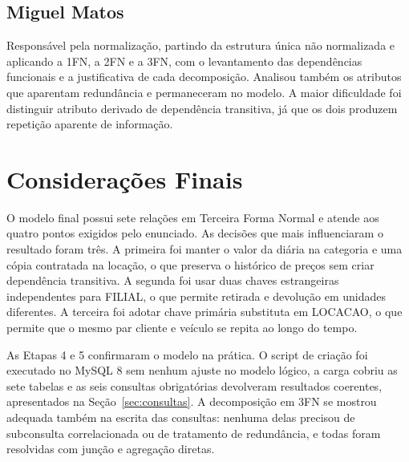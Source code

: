 \subsection{Miguel Matos}
Respons\'avel pela normaliza\c{c}\~ao, partindo da estrutura \'unica n\~ao normalizada e aplicando a 1FN, a 2FN e a 3FN, com o levantamento das depend\^encias funcionais e a justificativa de cada decomposi\c{c}\~ao. Analisou tamb\'em os atributos que aparentam redund\^ancia e permaneceram no modelo. A maior dificuldade foi distinguir atributo derivado de depend\^encia transitiva, j\'a que os dois produzem repeti\c{c}\~ao aparente de informa\c{c}\~ao.

\section{Considera\c{c}\~oes Finais}

O modelo final possui sete rela\c{c}\~oes em Terceira Forma Normal e atende aos quatro pontos exigidos pelo enunciado. As decis\~oes que mais influenciaram o resultado foram tr\^es. A primeira foi manter o valor da di\'aria na categoria e uma c\'opia contratada na loca\c{c}\~ao, o que preserva o hist\'orico de pre\c{c}os sem criar depend\^encia transitiva. A segunda foi usar duas chaves estrangeiras independentes para FILIAL, o que permite retirada e devolu\c{c}\~ao em unidades diferentes. A terceira foi adotar chave prim\'aria substituta em LOCACAO, o que permite que o mesmo par cliente e ve\'{i}culo se repita ao longo do tempo.

As Etapas 4 e 5 confirmaram o modelo na pr\'atica. O script de cria\c{c}\~ao foi executado no MySQL 8 sem nenhum ajuste no modelo l\'ogico, a carga cobriu as sete tabelas e as seis consultas obrigat\'orias devolveram resultados coerentes, apresentados na Se\c{c}\~ao~\ref{sec:consultas}. A decomposi\c{c}\~ao em 3FN se mostrou adequada tamb\'em na escrita das consultas: nenhuma delas precisou de subconsulta correlacionada ou de tratamento de redund\^ancia, e todas foram resolvidas com jun\c{c}\~ao e agrega\c{c}\~ao diretas.
